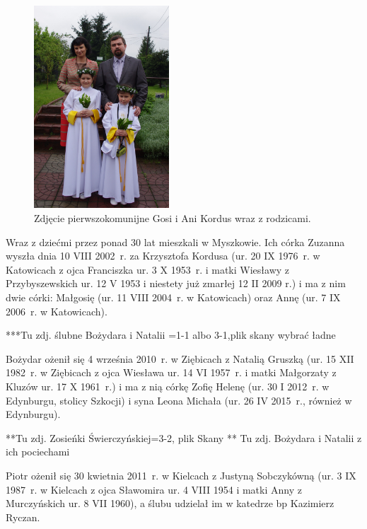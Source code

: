 \begin{figure}
\begin{center}
\includegraphics[width=0.45\textwidth, angle=90]{zdjecia/komunia_gosi_i_ani_kordus.jpg}
\caption[Pierwsza komunia św. Gosi i Ani Kordus]{Zdjęcie pierwszokomunijne Gosi i Ani Kordus wraz z rodzicami.}
\label{rys:komunia_gosi_i_ani_kordus}
\end{center}
\end{figure}

Wraz z dziećmi przez ponad 30 lat mieszkali w Myszkowie. Ich córka Zuzanna wyszła dnia 10 VIII 2002~r. za Krzysztofa Kordusa (ur. 20 IX 1976~r. w Katowicach z ojca Franciszka ur. 3 X 1953~r. i matki Wiesławy z Przybyszewskich ur. 12 V 1953 i niestety już zmarłej 12 II 2009 r.) i ma z nim dwie córki: Małgosię (ur. 11 VIII 2004~r. w Katowicach) oraz Annę (ur. 7 IX 2006~r. w Katowicach).



***Tu zdj. ślubne Bożydara i Natalii =1-1 albo 3-1,plik skany
wybrać ładne

Bożydar ożenił się 4 września 2010~r. w Ziębicach z Natalią Gruszką (ur. 15 XII 1982~r. w Ziębicach z ojca Wiesława ur. 14 VI 1957~r. i matki Małgorzaty z Kluzów ur. 17 X 1961~r.) i ma z nią córkę Zofię Helenę (ur. 30 I 2012~r. w Edynburgu, stolicy Szkocji) i syna Leona Michała (ur. 26 IV 2015~r., również w Edynburgu).

**Tu zdj. Zosieńki Świerczyńskiej=3-2, plik Skany
** Tu zdj. Bożydara i Natalii z ich pociechami

Piotr ożenił się 30 kwietnia 2011~r. w Kielcach z Justyną Sobczykówną (ur. 3 IX 1987~r. w Kielcach z ojca Sławomira ur. 4 VIII 1954 i matki Anny z Murczyńskich ur. 8 VII 1960), a ślubu udzielał im w katedrze bp Kazimierz Ryczan.

